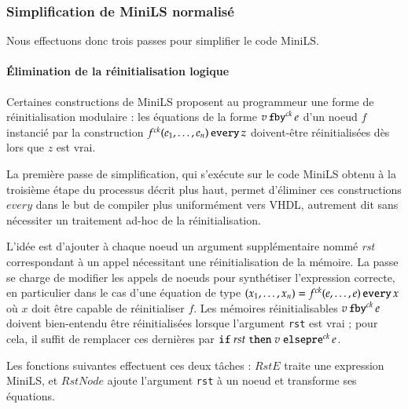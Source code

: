 \documentclass[9pt,a4paper]{article}
\newcommand{\mybox}[1]{\mbox{\tt{#1}}}
\newcommand{\Fby}[2]{#1 \, \mybox{fby}^{ck} \, #2}
\newcommand{\Pre}[1]{\mybox{pre}^{ck} \, #1}
\newcommand{\Every}[4]{#1^{ck}(#2,\dots,#3) \, \mybox{every} \, #4}
\newcommand{\If}[3]{\mybox{if} \; #1 \; \mybox{then} \; #2 \; \mybox{else} \; #3}
\begin{document}

\subsubsection{Simplification de MiniLS normalisé}

Nous effectuons donc trois passes pour simplifier le code MiniLS.

\paragraph{Élimination de la réinitialisation logique}

Certaines constructions de MiniLS proposent au programmeur une forme de
réinitialisation modulaire : les équations de la forme $\Fby{v}{e}$ d'un noeud
$f$ instancié par la construction $\Every{f}{e_1}{e_n}{z}$ doivent-être
réinitialisées dès lors que $z$ est vrai.

La première passe de simplification, qui s'exécute sur le code MiniLS obtenu à
la troisième étape du processus décrit plus haut, permet d'éliminer ces
constructions $every$ dans le but de compiler plus uniformément vers VHDL,
autrement dit sans nécessiter un traitement ad-hoc de la réinitialisation.

L'idée est d'ajouter à chaque noeud un argument supplémentaire nommé
\textit{rst} correspondant à un appel nécessitant une réinitialisation de la
mémoire. La passe se charge de modifier les appels de noeuds pour synthétiser
l'expression correcte, en particulier dans le cas d'une équation de type $(x_1,
\dots, x_n) = \Every{f}{e}{e}{x}$ où $x$ doit être capable de réinitialiser
$f$. Les mémoires réinitialisables $\Fby{v}{e}$ doivent bien-entendu être
réinitialisées lorsque l'argument \texttt{rst} est vrai ; pour cela, il suffit
de remplacer ces dernières par $\If{rst}{v}{\newline \Pre{e}}$.

Les fonctions suivantes effectuent ces deux tâches : $RstE$ traite une
expression MiniLS, et $RstNode$ ajoute l'argument \texttt{rst} à un noeud et
transforme ses équations.

\newcommand{\re}[1]{RstE(#1)}
\newcommand{\rstn}[1]{RstNode(#1)}
\end{document}
